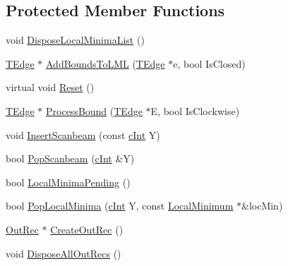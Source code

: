 \subsection*{Protected Member Functions}
\begin{DoxyCompactItemize}
\item 
void \mbox{\hyperlink{class_clipper_lib_1_1_clipper_base_a311dbbec1454ab7965e363a0359f5ee4}{Dispose\+Local\+Minima\+List}} ()
\item 
\mbox{\hyperlink{struct_clipper_lib_1_1_t_edge}{T\+Edge}} $\ast$ \mbox{\hyperlink{class_clipper_lib_1_1_clipper_base_a906ea17c9dc8822d689e54c3243e7f58}{Add\+Bounds\+To\+L\+ML}} (\mbox{\hyperlink{struct_clipper_lib_1_1_t_edge}{T\+Edge}} $\ast$e, bool Is\+Closed)
\item 
virtual void \mbox{\hyperlink{class_clipper_lib_1_1_clipper_base_a125febb065f23fc55dafffe8d185b642}{Reset}} ()
\item 
\mbox{\hyperlink{struct_clipper_lib_1_1_t_edge}{T\+Edge}} $\ast$ \mbox{\hyperlink{class_clipper_lib_1_1_clipper_base_a292655c74a7e70a8b8829337c632bdf0}{Process\+Bound}} (\mbox{\hyperlink{struct_clipper_lib_1_1_t_edge}{T\+Edge}} $\ast$E, bool Is\+Clockwise)
\item 
void \mbox{\hyperlink{class_clipper_lib_1_1_clipper_base_ac22b052dbbc15b6e5e4304be72bd9ed0}{Insert\+Scanbeam}} (const \mbox{\hyperlink{namespace_clipper_lib_a7156730a24951629192d4831334bafaa}{c\+Int}} Y)
\item 
bool \mbox{\hyperlink{class_clipper_lib_1_1_clipper_base_acb0b72fccefe130d4dc2d3b114e4a2a6}{Pop\+Scanbeam}} (\mbox{\hyperlink{namespace_clipper_lib_a7156730a24951629192d4831334bafaa}{c\+Int}} \&Y)
\item 
bool \mbox{\hyperlink{class_clipper_lib_1_1_clipper_base_ae091022ac37f757ab489e9217d2e4934}{Local\+Minima\+Pending}} ()
\item 
bool \mbox{\hyperlink{class_clipper_lib_1_1_clipper_base_aeaf9a35b1e38d1559f24ead2cf211854}{Pop\+Local\+Minima}} (\mbox{\hyperlink{namespace_clipper_lib_a7156730a24951629192d4831334bafaa}{c\+Int}} Y, const \mbox{\hyperlink{struct_clipper_lib_1_1_local_minimum}{Local\+Minimum}} $\ast$\&loc\+Min)
\item 
\mbox{\hyperlink{struct_clipper_lib_1_1_out_rec}{Out\+Rec}} $\ast$ \mbox{\hyperlink{class_clipper_lib_1_1_clipper_base_aca2ca824b655002903cecf47e9eff859}{Create\+Out\+Rec}} ()
\item 
void \mbox{\hyperlink{class_clipper_lib_1_1_clipper_base_a59e59d75571ee6db76c2b17f1e6d5496}{Dispose\+All\+Out\+Recs}} ()

\end{DoxyCompactItemize}
